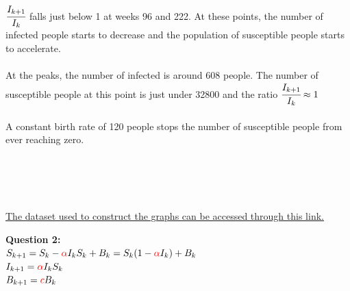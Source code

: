 \documentclass[12pt]{article}
\begin{document}
$\cfrac{I_{k+1}}{I_k}$ falls just below 1 at weeks 96 and 222. At these points, the number of infected people starts to decrease and the population of susceptible people starts to accelerate.\\\\
At the peaks, the number of infected is around 608 people. The number of susceptible people at this point is just under 32800 and the ratio $\cfrac{I_{k+1}}{I_k} \approx 1$\\\\
A constant birth rate of 120 people stops the number of susceptible people from ever reaching zero.\\\\\\\\\
\begin{center}
\small \href{https://github.com/chenjoshua7/SIR_model_measles/blob/master/Problem%201/Datasets/GPS5_master_data.csv}{The dataset used to construct the graphs can be accessed through this link.}
\end{center}
\break
{\bf Question 2:}\\
$S_{k+1} = S_k - \textcolor{red} {\alpha} I_k S_k + B_k = S_k(1 - \textcolor{red} {\alpha} I_k) + B_k $\\
$I_{k+1} = \textcolor{red} {\alpha} I_k S_k$\\
$B_{k+1} = \textcolor{red}{c} B_k$\\
\end{document}

